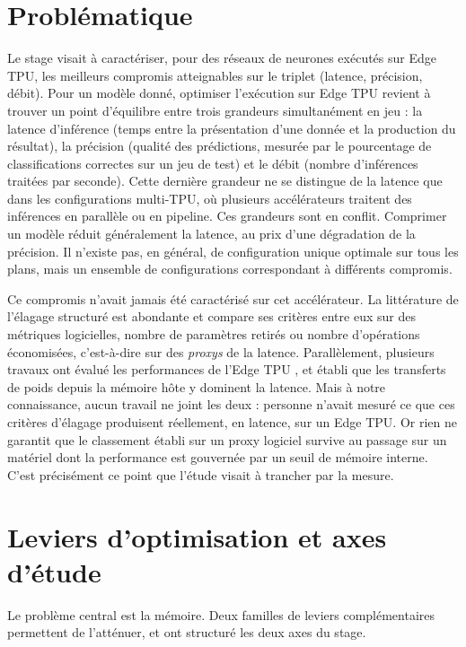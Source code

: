 \documentclass[11pt,a4paper]{report}
\begin{document}
\section{Problématique}

Le stage visait à caractériser, pour des réseaux de neurones exécutés sur Edge TPU, les meilleurs compromis atteignables sur le triplet (latence, précision, débit). Pour un modèle donné, optimiser l'exécution sur Edge TPU revient à trouver un point d'équilibre entre trois grandeurs simultanément en jeu : la latence d'inférence (temps entre la présentation d'une donnée et la production du résultat), la précision (qualité des prédictions, mesurée par le pourcentage de classifications correctes sur un jeu de test) et le débit (nombre d'inférences traitées par seconde). Cette dernière grandeur ne se distingue de la latence que dans les configurations multi-TPU, où plusieurs accélérateurs traitent des inférences en parallèle ou en pipeline. Ces grandeurs sont en conflit. Comprimer un modèle réduit généralement la latence, au prix d'une dégradation de la précision. Il n'existe pas, en général, de configuration unique optimale sur tous les plans, mais un ensemble de configurations correspondant à différents compromis.

Ce compromis n'avait jamais été caractérisé sur cet accélérateur. La littérature de l'élagage structuré est abondante et compare ses critères entre eux sur des métriques logicielles, nombre de paramètres retirés ou nombre d'opérations économisées, c'est-à-dire sur des \emph{proxys} de la latence. Parallèlement, plusieurs travaux ont évalué les performances de l'Edge TPU \cite{seshadriEvaluationEdgeTPU2022,gaoWorkInProgressModeling2025,villarrubiaImprovingInferenceTime2023}, et établi que les transferts de poids depuis la mémoire hôte y dominent la latence. Mais à notre connaissance, aucun travail ne joint les deux : personne n'avait mesuré ce que ces critères d'élagage produisent réellement, en latence, sur un Edge TPU. Or rien ne garantit que le classement établi sur un proxy logiciel survive au passage sur un matériel dont la performance est gouvernée par un seuil de mémoire interne. C'est précisément ce point que l'étude visait à trancher par la mesure.

\section{Leviers d'optimisation et axes d'étude}

Le problème central est la mémoire. Deux familles de leviers complémentaires permettent de l'atténuer, et ont structuré les deux axes du stage.
\end{document}
